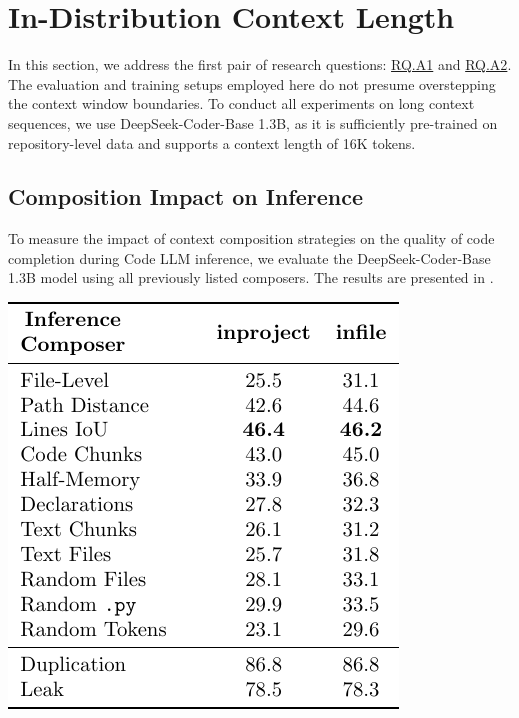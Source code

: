 \section{In-Distribution Context Length}

In this section, we address the first pair of research questions: \hyperref[rq:rq-a1]{RQ.A1} and \hyperref[rq:rq-a2]{RQ.A2}. The evaluation and training setups employed here do not presume overstepping the context window boundaries. To conduct all experiments on long context sequences, we use DeepSeek-Coder-Base 1.3B, as it is sufficiently pre-trained on repository-level data and supports a context length of 16K tokens.

\subsection{Composition Impact on Inference}\label{sec:composition-impact-on-inference}

To measure the impact of context composition strategies on the quality of code completion during Code LLM inference, we evaluate the DeepSeek-Coder-Base 1.3B model \parencite{guo2024} using all previously listed composers. The results are presented in .

\begin{table}[htbp]
    \centering
    \includegraphics{tables/rq-a1.pdf}
    \label{tab:dseek-inference}
\end{table}


